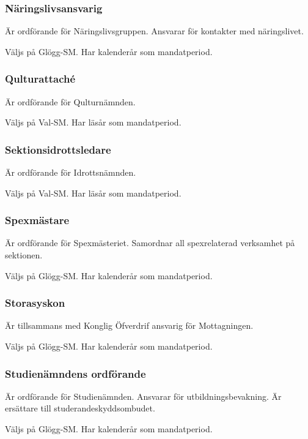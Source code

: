 \documentclass{dgovdoc}
\begin{document}
\subsubsection{Näringslivsansvarig}

Är ordförande för Näringslivsgruppen. Ansvarar för kontakter med näringslivet.

Väljs på Glögg-SM. Har kalenderår som mandatperiod.

\subsubsection{Qulturattaché}

Är ordförande för Qulturnämnden.

Väljs på Val-SM. Har läsår som mandatperiod.

\subsubsection{Sektionsidrottsledare}

Är ordförande för Idrottsnämnden.

Väljs på Val-SM. Har läsår som mandatperiod.

\subsubsection{Spexmästare}

Är ordförande för Spexmästeriet. Samordnar all spexrelaterad verksamhet på
sektionen.

Väljs på Glögg-SM. Har kalenderår som mandatperiod.

\subsubsection{Storasyskon}

Är tillsammans med Konglig Öfverdrif ansvarig för Mottagningen.

Väljs på Glögg-SM. Har kalenderår som mandatperiod.

\subsubsection{Studienämndens ordförande}

Är ordförande för Studienämnden. Ansvarar för utbildningsbevakning. Är
ersättare till studerandeskyddsombudet.

Väljs på Glögg-SM. Har kalenderår som mandatperiod.
\end{document}
